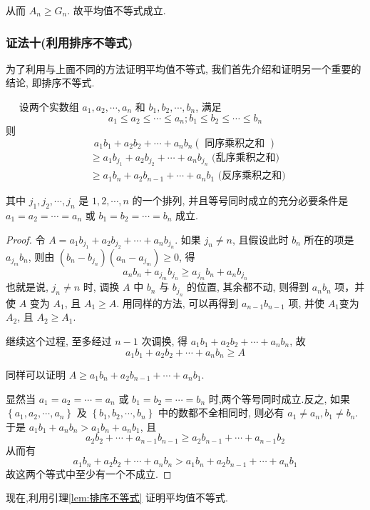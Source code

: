从而 $A_{n} \geqslant G_{n}$. 故平均值不等式成立.

\subsubsection*{证法十(利用排序不等式)}

为了利用与上面不同的方法证明平均值不等式, 我们首先介绍和证明另一个重要的结论, 即排序不等式.
\begin{lemma}[排序不等式]\label{lem:排序不等式}
$\quad$ 设两个实数组 $a_{1}, a_{2}, \cdots, a_{n}$ 和 $b_{1}, b_{2}, \cdots, b_{n}$, 满足
$$
a_{1} \leqslant a_{2} \leqslant \cdots \leqslant a_{n} ; b_{1} \leqslant b_{2} \leqslant \cdots \leqslant b_{n}
$$
则
$$
a_{1} b_{1}+a_{2} b_{2}+\cdots+a_{n} b_{n}(\text { 同序乘积之和 })
$$
$$
\begin{aligned}
& \geqslant a_{1} b_{j_{1}}+a_{2} b_{j_{2}}+\cdots+a_{n} b_{j_{n}} \text { (乱序乘积之和) } \\
& \geqslant a_{1} b_{n}+a_{2} b_{n-1}+\cdots+a_{n} b_{1} \text { (反序乘积之和) }
\end{aligned}
$$

其中 $j_{1}, j_{2}, \cdots, j_{n}$ 是 $1,2, \cdots, n$ 的一个排列, 并且等号同时成立的充分必要条件是 $a_{1}=a_{2}=\cdots=a_{n}$ 或 $b_{1}=b_{2}=\cdots=b_{n}$ 成立.
\end{lemma}
\begin{proof}
令 $A=a_{1} b_{j_{1}}+a_{2} b_{j_{2}}+\cdots+a_{n} b_{j_{n}}$. 如果 $j_{n} \neq n$, 且假设此时 $b_{n}$ 所在的项是 $a_{j_{m}} b_{n}$, 则由 $\left(b_{n}-b_{j_{n}}\right)\left(a_{n}-a_{j_{m}}\right) \geqslant 0$, 得
$$
a_{n} b_{n}+a_{j_{m}} b_{j_{n}} \geqslant a_{j_{m}} b_{n}+a_{n} b_{j_{n}}
$$
也就是说, $j_{n} \neq n$ 时, 调换 $A$ 中 $b_{n}$ 与 $b_{j_{n}}$ 的位置, 其余都不动, 则得到 $a_{n} b_{n}$ 项，并使 $A$ 变为 $A_{1}$, 且 $A_{1} \geqslant A$. 用同样的方法, 可以再得到 $a_{n-1} b_{n-1}$ 项, 并使 $A_{1}$变为 $A_{2}$, 且 $A_{2} \geqslant A_{1}$.

继续这个过程, 至多经过 $n-1$ 次调换, 得 $a_{1} b_{1}+a_{2} b_{2}+\cdots+a_{n} b_{n}$, 故
$$
a_{1} b_{1}+a_{2} b_{2}+\cdots+a_{n} b_{n} \geqslant A
$$

同样可以证明 $A \geqslant a_{1} b_{n}+a_{2} b_{n-1}+\cdots+a_{n} b_{1}$.

显然当 $a_{1}=a_{2}=\cdots=a_{n}$ 或 $b_{1}=b_{2}=\cdots=b_{n}$ 时,两个等号同时成立.反之, 如果 $\left\{a_{1}, a_{2}, \cdots, a_{n}\right\}$ 及 $\left\{b_{1}, b_{2}, \cdots, b_{n}\right\}$ 中的数都不全相同时, 则必有 $a_{1} \neq a_{n}, b_{1} \neq b_{n}$. 于是 $a_{1} b_{1}+a_{n} b_{n}>a_{1} b_{n}+a_{n} b_{1}$, 且
$$
a_{2} b_{2}+\cdots+a_{n-1} b_{n-1} \geqslant a_{2} b_{n-1}+\cdots+a_{n-1} b_{2}
$$
从而有
$$
a_{1} b_{n}+a_{2} b_{2}+\cdots+a_{n} b_{n}>a_{1} b_{n}+a_{2} b_{n-1}+\cdots+a_{n} b_{1}
$$
故这两个等式中至少有一个不成立.
\end{proof}
现在,利用引理\ref{lem:排序不等式} 证明平均值不等式.

